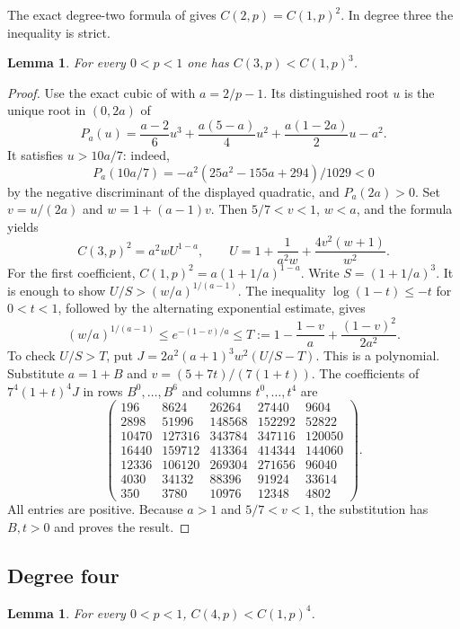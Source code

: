 \documentclass[11pt]{article}
\newtheorem{lemma}[theorem]{Lemma}
\begin{document}
The exact degree-two formula of \cite[Theorem~1]{BrevigSaksman}
gives \(C(2,p)=C(1,p)^2\). In degree three the inequality is
strict.

\begin{lemma}\label{lem:cubic-domination}
For every \(0<p<1\) one has \(C(3,p)<C(1,p)^3\).
\end{lemma}

\begin{proof}
Use the exact cubic of \cite{Low} with \(a=2/p-1\). Its
distinguished root \(u\) is the unique root in \((0,2a)\) of
\[
 P_a(u)=\frac{a-2}{6}u^3+\frac{a(5-a)}4u^2
                  +\frac{a(1-2a)}2u-a^2 .
\]
It satisfies \(u>10a/7\): indeed,
\[
 P_a(10a/7)=-a^2(25a^2-155a+294)/1029<0
\]
by the negative discriminant of the displayed quadratic,
and \(P_a(2a)>0\). Set \(v=u/(2a)\) and \(w=1+(a-1)v\).
Then \(5/7<v<1\), \(w<a\), and the formula yields
\[
 C(3,p)^2=a^2 w U^{1-a},\qquad
 U=1+\frac{1}{a^2w}+\frac{4v^2(w+1)}{w^2}.
\]
For the first coefficient, \(C(1,p)^2=a(1+1/a)^{1-a}\).
Write \(S=(1+1/a)^3\). It is enough to show
\(U/S>(w/a)^{1/(a-1)}\).
The inequality \(\log(1-t)\leq-t\) for \(0<t<1\), followed
by the alternating exponential estimate, gives
\[
 (w/a)^{1/(a-1)}
 \leq e^{-(1-v)/a}
 \leq T:=1-\frac{1-v}{a}+\frac{(1-v)^2}{2a^2}.
\]
To check \(U/S>T\), put
\(J=2a^2(a+1)^3 w^2(U/S-T)\). This is a polynomial.
Substitute \(a=1+B\) and \(v=(5+7t)/(7(1+t))\).
The coefficients of \(7^4(1+t)^4J\) in rows \(B^0,\ldots,B^6\)
and columns \(t^0,\ldots,t^4\) are
\[
 \begin{pmatrix}
 196&8624&26264&27440&9604\\
 2898&51996&148568&152292&52822\\
 10470&127316&343784&347116&120050\\
 16440&159712&413364&414344&144060\\
 12336&106120&269304&271656&96040\\
 4030&34132&88396&91924&33614\\
 350&3780&10976&12348&4802
 \end{pmatrix}.
\]
All entries are positive. Because \(a>1\) and \(5/7<v<1\),
the substitution has \(B,t>0\) and proves the result.
\end{proof}

\subsection{Degree four}

\begin{lemma}\label{lem:quartic-domination}
For every \(0<p<1\), \(C(4,p)<C(1,p)^4\).
\end{lemma}
\end{document}
